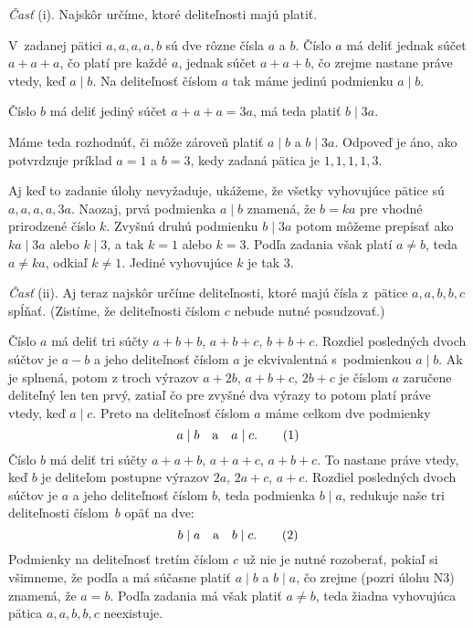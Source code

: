 {%
{\it Časť\/} (i).
Najskôr určíme, ktoré deliteľnosti majú platiť.

V~zadanej pätici $a,a,a,a,b$ sú dve rôzne čísla $a$ a $b$. Číslo $a$
má deliť jednak súčet $a+a+a$, čo platí pre každé $a$, jednak
súčet $a+a+b$, čo zrejme nastane práve vtedy, keď $a\mid b$.
Na deliteľnosť číslom $a$ tak máme jedinú podmienku $a\mid b$.

Číslo $b$ má deliť jediný súčet $a+a+a=3a$, má teda platiť $b\mid 3a$.

Máme teda rozhodnúť, či môže zároveň platiť $a\mid b$ a
$b\mid 3a$. Odpoveď je áno, ako potvrdzuje príklad $a=1$ a $b=3$,
kedy zadaná pätica je $1,1,1,1,3$.

Aj keď to zadanie úlohy nevyžaduje, ukážeme, že všetky vyhovujúce pätice
sú $a,a,a,a,3a$. Naozaj, prvá podmienka $a\mid b$ znamená, že
$b=ka$ pre vhodné prirodzené číslo $k$. Zvyšnú druhú podmienku
$b\mid 3a$ potom môžeme prepísať ako $ka\mid 3a$ alebo $k\mid
3$, a tak $k=1$ alebo $k=3$. Podľa zadania však platí $a\ne b$,
teda $a\ne ka$, odkiaľ $k\ne1$. Jediné vyhovujúce $k$ je tak 3.

\smallskip
{\it Časť\/} (ii). Aj teraz najskôr určíme deliteľnosti, ktoré majú
čísla z~pätice $a,a,b,b,c$ spĺňať. (Zistíme, že deliteľnosti
číslom $c$ nebude nutné posudzovať.)

Číslo $a$ má deliť tri súčty $a+b+b$, $a+b+c$, $b+b+c$.
Rozdiel posledných dvoch súčtov je $a-b$ a jeho deliteľnosť číslom $a$
je ekvivalentná s~podmienkou $a\mid b$. Ak je splnená, potom
z troch výrazov $a+2b$, $a+b+c$, $2b+c$ je číslom $a$ zaručene
deliteľný len ten prvý, zatiaľ čo pre zvyšné dva výrazy to potom
platí práve vtedy, keď $a\mid c$. Preto na deliteľnosť číslom $a$
máme celkom dve podmienky
$$
a\mid b\quad\hbox{a}\quad a\mid c.
\tag1
$$
Číslo $b$ má deliť tri súčty $a+a+b$, $a+a+c$, $a+b+c$.
To nastane práve vtedy, keď $b$ je deliteľom postupne výrazov
$2a$, $2a+c$, $a+c$. Rozdiel posledných
dvoch súčtov je $a$ a jeho deliteľnosť číslom $b$, teda podmienka
$b\mid a$, redukuje naše tri deliteľnosti číslom~$b$
opäť na dve:
$$
b\mid a\quad\hbox{a}\quad b\mid c.
\tag2
$$
Podmienky na deliteľnosť tretím číslom $c$ už nie je nutné
rozoberať, pokiaľ si všimneme, že podľa  a  má súčasne
platiť $a\mid b$ a $b\mid a$, čo zrejme (pozri úlohu N3) znamená,
že $a=b$. Podľa zadania má však platiť $a\ne b$, teda žiadna
vyhovujúca pätica $a,a,b,b,c$ neexistuje.

}

